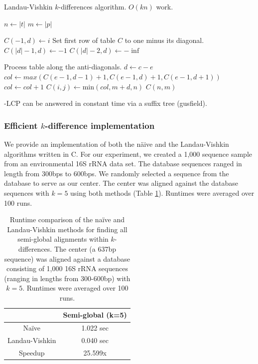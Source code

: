  \begin{algorithm}
 \caption{Landau-Vishkin $k$-differences algorithm. $O(kn)$ work.}\label{landau_vishkin}
 \begin{algorithmic}[1]
 \State $n\gets |t|$
 \State $m\gets |p|$

   \State $C(-1,d) \gets i$ \EndFor \Comment Set first row of table $C$ to one minus its diagonal. 
    \State $C(|d| - 1 ,d) \gets -1$
    \State $C(|d| - 2 ,d) \gets -\inf$
\EndFor

  \Comment Process table along the anti-diagonals.
  \State $d \gets c - e$
  \State $col \gets max(C(e-1,d-1) + 1,C(e-1,d)+ 1,C(e-1,d+1))$
    \State $col \gets col + 1$
  \EndWhile
  \State $C(i,j) \gets \text{min}(col, m + d, n)$
\EndFor
\EndFor
\Return $C(n,m)$
\EndProcedure
\end{algorithmic}
\end{algorithm}



-LCP can be answered in constant time via a suffix tree (gusfield).


\subsubsection{Efficient $k$-difference implementation}
We provide an implementation of both the n\"aive and the Landau-Vishkin algorithms written in C.
For our experiment, we created a 1,000 sequence sample from an environmental 16S rRNA data set.
The database sequences ranged in length from 300bps to 600bps.
We randomly selected a sequence from the database to serve as our center. 
The center was aligned against the database sequences with $k=5$ using both methods (Table \ref{table:naive_vishkin}).
Runtimes were averaged over 100 runs.

\begin{center}
\begin{table}[h]
\centering
\begin{tabular}{c|c}
               & Semi-global (k=5) \\
\hline 
Na\"ive          & 1.022 sec  \\
Landau-Vishkin & 0.040 sec \\
\hline 
Speedup        & 25.599x
\end{tabular}
\caption{Runtime comparison of the na\"ive and Landau-Vishkin\cite{landau_introducing_1986} methods for finding all semi-global alignments within $k$-differences. The center (a 637bp sequence) was aligned against a database consisting of 1,000 16S rRNA sequences (ranging in lengths from 300-600bp) with $k=5$.  Runtimes were averaged over 100 runs.}
\label{table:naive_vishkin}
\end{table}
\end{center}

